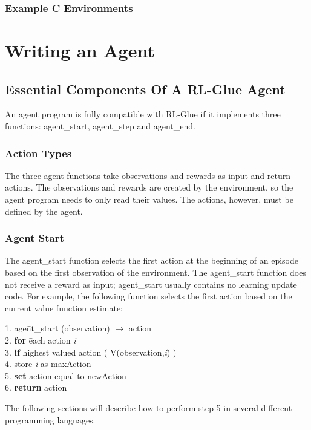 \documentclass[11pt]{article}
\begin{document}
\subsubsection{Example C Environments}







\section{Writing an Agent}
\label{agent}

\subsection{Essential Components Of A RL-Glue Agent}
\label{agentp1}

An agent program is fully compatible with RL-Glue if it implements three functions: agent\_start, agent\_step and agent\_end. 

\subsubsection{Action Types}
The three agent functions take observations and rewards as input and return actions. The observations and rewards are created by the environment, so the agent program needs to only read their values. The actions, however, must be defined by the agent.

\subsubsection{Agent Start}
The agent\_start function selects the first action at the beginning of an episode based on the first observation of the environment. The agent\_start function does not receive a reward as input; agent\_start usually contains no learning update code. For example, the following function selects the first action based on the current value function estimate:
\begin{tabbing}
1. age\=nt\_start (observation) $\rightarrow$ action\\
2. \> {\bf for} \= each action {\it i}\\
3.\>\> {\bf if} highest valued action ( V(observation,{\it i}) )\\ 
4. \> store {\it i} as maxAction\\
5. \> {\bf set} action equal to newAction\\
6. {\bf return} action
\end{tabbing}
The following sections will describe how to perform step 5 in several different programming languages.
\end{document}
